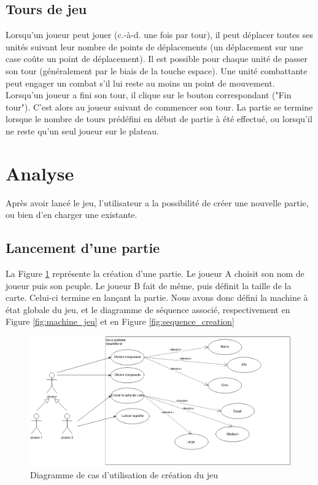 \documentclass[a4paper]{article}
\begin{document}
	\subsection{Tours de jeu}
Lorsqu’un joueur peut jouer (c.-à-d. une fois par tour), il peut déplacer toutes ses unités suivant leur nombre de points de déplacements (un déplacement sur une case coûte un point de déplacement). Il est possible pour chaque unité de passer son tour (généralement par le biais de la touche espace). Une unité combattante peut engager un combat s’il lui reste au moins un point de mouvement. Lorsqu’un joueur a fini son tour, il clique sur le bouton correspondant ("Fin tour"). C’est alors au joueur suivant de commencer son tour. La partie se termine lorsque le nombre de tours prédéfini en début de partie à été effectué, ou lorsqu’il ne reste qu’un seul joueur sur le plateau.

\section{Analyse}
	
Après avoir lancé le jeu, l'utilisateur a la possibilité de créer une nouvelle partie, ou bien d'en charger une existante.
	
	\subsection{Lancement d'une partie}
La Figure \ref{fig:cas_creation} représente la création d'une partie. Le joueur A choisit son nom de joueur puis son peuple. Le joueur B fait de même, puis définit la taille de la carte. Celui-ci termine en lançant la partie. Nous avons donc défini la machine à état globale du jeu, et le diagramme de séquence associé, respectivement en Figure \ref{fig:machine_jeu} et en Figure \ref{fig:sequence_creation}

\begin{figure}[ht]
\centering
	\includegraphics[width=1\textwidth]{../Schemas/CU_Creation.png}
		\caption{Diagramme de cas d'utilisation de création du jeu}
		\label{fig:cas_creation}
\end{figure}
\end{document}
